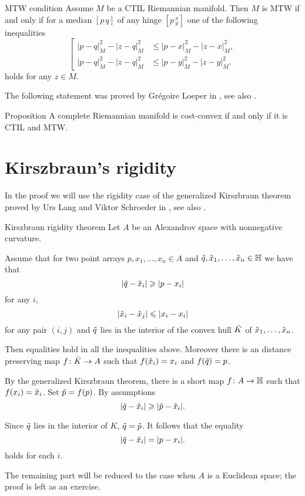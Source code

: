 \begin{thm}{MTW condition}\label{MTW}
Assume $M$ be a CTIL Riemannian manifold. 
Then $M$ is MTW if and only if for a median $[p\,q]$ of any hinge $[p\,^x_y]$ one of the following inequalities
\[
\left[
\begin{aligned}
|p-q|^2_M-|z-q|^2_M&\le |p-x|^2_M-|z-x|^2_M,
\\
|p-q|^2_M-|z-q|^2_M&\le |p-y|^2_M-|z-y|^2_M.
\end{aligned}
\right.
\]
holds for any $z\in M$.
\end{thm}

The following statement was proved by Gr\'egoire Loeper in \cite{loeper}, see also \cite[Proposition 2.5]{MTW+CTIL}.

\begin{thm}{Proposition}\label{prop:cost-convex=CTIL+MTW}
A complete Riemannian manifold is cost-convex if and only if it is CTIL and MTW. 
\end{thm}

\section{Kirszbraun's rigidity}
In the proof we will use the rigidity case of the generalized Kirszbraun theorem proved by Urs Lang and Viktor Schroeder in \cite{LS}, see also \cite{AKP}.

\begin{thm}{Kirszbraun rigidity theorem}\label{thm:kirszbraun-rigid}
Let $A$ be an Alexandrov space with nonnegative curvature.

Assume that for two point arrays $p,x_1,\dots,x_n\in A$ and $\~q, \~x_1,\dots,\~x_n\in \HH$ we have that 
\[|\~q-\~x_i|\ge |p-x_i|\]
for any $i$,
\[|\~x_i-\~x_j|\le |x_i-x_i|\]
for any pair $(i,j)$
and $\~q$ lies in the interior of the convex hull $\~K$ of $\~x_1,\dots,\~x_n$.

Then equalities hold in all the inequalities above.
Moreover there is an distance preserving map $f\:\~K\to A$ such that $f(\~x_i)=x_i$ and $f(\~q)=p$. 
\end{thm}

By the generalized Kirszbraun theorem, there is a short map $f\:A\to \HH$
such that $f(x_i)=\~x_i$.
Set  $\~p=f(p)$.
By assumptions
\[|\~q-\~x_i|\ge |\~p-\~x_i|.\]

Since $\~q$ lies in the interior of $K$, $\~q=\~p$.
It follows that the equality 
\[|\~q-\~x_i|= |p-x_i|.\]
holds for each $i$.

The remaining part will be reduced to the case when $A$ is a Euclidean space;
the proof is left as an exercise.

